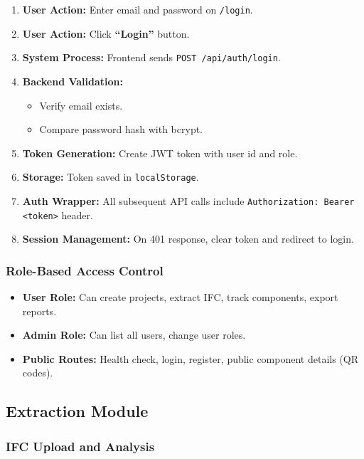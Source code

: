 \documentclass[11pt,a4paper]{article}
\begin{document}
\begin{enumerate}[leftmargin=*]
    \item \textbf{User Action:} Enter email and password on \texttt{/login}.
    \item \textbf{User Action:} Click \textbf{``Login''} button.
    \item \textbf{System Process:} Frontend sends \texttt{POST /api/auth/login}.
    \item \textbf{Backend Validation:}
        \begin{itemize}
            \item Verify email exists.
            \item Compare password hash with bcrypt.
        \end{itemize}
    \item \textbf{Token Generation:} Create JWT token with user id and role.
    \item \textbf{Storage:} Token saved in \texttt{localStorage}.
    \item \textbf{Auth Wrapper:} All subsequent API calls include \texttt{Authorization: Bearer <token>} header.
    \item \textbf{Session Management:} On 401 response, clear token and redirect to login.
\end{enumerate}

\subsubsection{Role-Based Access Control}

\begin{itemize}
    \item \textbf{User Role:} Can create projects, extract IFC, track components, export reports.
    \item \textbf{Admin Role:} Can list all users, change user roles.
    \item \textbf{Public Routes:} Health check, login, register, public component details (QR codes).
\end{itemize}

\subsection{Extraction Module}

\subsubsection{IFC Upload and Analysis}
\end{document}
